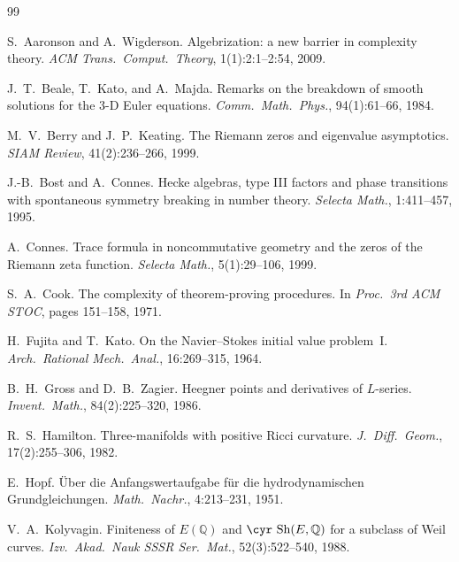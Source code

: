 \documentclass[11pt,a4paper]{article}
\theoremstyle{definition}
\theoremstyle{remark}
\begin{document}
\begin{thebibliography}{99}

S.\ Aaronson and A.\ Wigderson.
\newblock Algebrization: a new barrier in complexity theory.
\newblock \emph{ACM Trans.\ Comput.\ Theory}, 1(1):2:1--2:54, 2009.

J.\ T.\ Beale, T.\ Kato, and A.\ Majda.
\newblock Remarks on the breakdown of smooth solutions for the
3-D Euler equations.
\newblock \emph{Comm.\ Math.\ Phys.}, 94(1):61--66, 1984.

M.\ V.\ Berry and J.\ P.\ Keating.
\newblock The Riemann zeros and eigenvalue asymptotics.
\newblock \emph{SIAM Review}, 41(2):236--266, 1999.

J.-B.\ Bost and A.\ Connes.
\newblock Hecke algebras, type III factors and phase transitions
with spontaneous symmetry breaking in number theory.
\newblock \emph{Selecta Math.}, 1:411--457, 1995.

A.\ Connes.
\newblock Trace formula in noncommutative geometry and the zeros
of the Riemann zeta function.
\newblock \emph{Selecta Math.}, 5(1):29--106, 1999.

S.\ A.\ Cook.
\newblock The complexity of theorem-proving procedures.
\newblock In \emph{Proc.\ 3rd ACM STOC}, pages 151--158, 1971.

H.\ Fujita and T.\ Kato.
\newblock On the Navier--Stokes initial value problem~I.
\newblock \emph{Arch.\ Rational Mech.\ Anal.}, 16:269--315, 1964.

B.\ H.\ Gross and D.\ B.\ Zagier.
\newblock Heegner points and derivatives of $L$-series.
\newblock \emph{Invent.\ Math.}, 84(2):225--320, 1986.

R.\ S.\ Hamilton.
\newblock Three-manifolds with positive Ricci curvature.
\newblock \emph{J.\ Diff.\ Geom.}, 17(2):255--306, 1982.

E.\ Hopf.
\newblock \"Uber die Anfangswertaufgabe f\"ur die hydrodynamischen
Grundgleichungen.
\newblock \emph{Math.\ Nachr.}, 4:213--231, 1951.

V.\ A.\ Kolyvagin.
\newblock Finiteness of $E(\mathbb{Q})$ and $\mbox{\cyr Sh}(E,\mathbb{Q})$
for a subclass of Weil curves.
\newblock \emph{Izv.\ Akad.\ Nauk SSSR Ser.\ Mat.}, 52(3):522--540, 1988.


\end{thebibliography}
\end{document}
